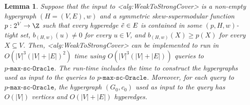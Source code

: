 \documentclass{article}
\def\Cref#1{<#1>}%
\newtheorem{lemma}{Lemma}[section]
\newcommand{\functionMaximizationOracleStrongCover}[1]{\ensuremath{{#1}\text{-}\mathtt{max}\text{-}\mathtt{sc}\text{-}\mathtt{Oracle}}\xspace}
\begin{document}
\begin{lemma}\label{lem:WeakToStrong:strongly-polytime:main}
Suppose that the input to \Cref{alg:WeakToStrongCover} is a non-empty hypergraph $(H = (V, E), w)$ and a symmetric skew-supermodular function $p:2^V\rightarrow \Z$ such that every hyperedge $\Tilde{e} \in E$ is contained in some $(p, H, w)$-tight set, $b_{(H,w)}(u) \not = 0$ for every $u \in V$, and $b_{(H,w)}(X) \geq p(X)$ for every $X \subseteq V$.
 Then, \Cref{alg:WeakToStrongCover}  can be implemented to run in $O(|V|^3(|V| + |E|)^2)$ time using $O(|V|^3(|V|+|E|))$ queries to \functionMaximizationOracleStrongCover{p}. The run-time includes the time to construct the hypergraphs used as input to the queries to \functionMaximizationOracleStrongCover{p}.
Moreover, for each query to \functionMaximizationOracleStrongCover{p}, the hypergraph $(G_0, c_0)$ used as input to the query has $O(|V|)$ vertices and $O(|V|+|E|)$ hyperedges.
\end{lemma}
\end{document}
